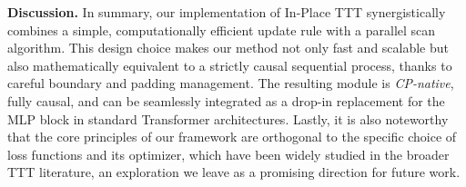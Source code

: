 \textbf{Discussion.}
In summary, our implementation of In-Place TTT synergistically combines a simple, computationally efficient update rule with a parallel scan algorithm. This design choice makes our method not only fast and scalable but also mathematically equivalent to a strictly causal sequential process, thanks to careful boundary and padding management. The resulting module is \textit{CP-native}, fully causal, and can be seamlessly integrated as a drop-in replacement for the MLP block in standard Transformer architectures. Lastly, it is also noteworthy that the core principles of our framework are orthogonal to the specific choice of loss functions and its optimizer, which have been widely studied in the broader TTT literature, an exploration we leave as a promising direction for future work.